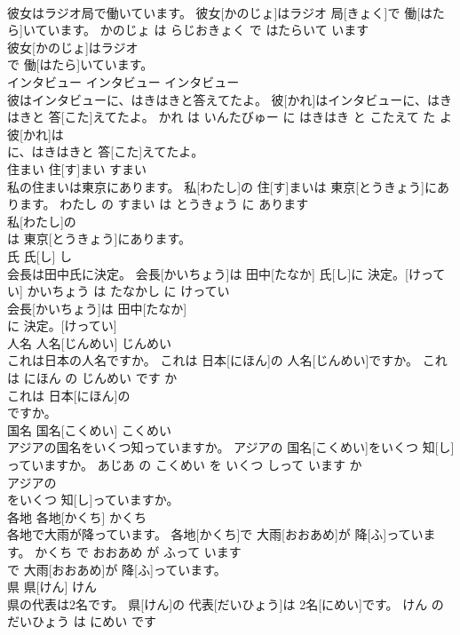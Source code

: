 \documentclass[8pt]{extreport}
\begin{document}
\begin{CJK}{UTF8}{min}
\\	彼女はラジオ局で働いています。	彼女[かのじょ]はラジオ 局[きょく]で 働[はたら]いています。	かのじょ は らじおきょく で はたらいて います	
\\	彼女[かのじょ]はラジオ
\\	で 働[はたら]いています。			
\\	インタビュー	インタビュー	インタビュー	
\\	彼はインタビューに、はきはきと答えてたよ。	彼[かれ]はインタビューに、はきはきと 答[こた]えてたよ。	かれ は いんたびゅー に はきはき と こたえて た よ	
\\	彼[かれ]は
\\	に、はきはきと 答[こた]えてたよ。			
\\	住まい	住[す]まい	すまい	
\\	私の住まいは東京にあります。	私[わたし]の 住[す]まいは 東京[とうきょう]にあります。	わたし の すまい は とうきょう に あります	
\\	私[わたし]の
\\	は 東京[とうきょう]にあります。			
\\	氏	氏[し]	し	
\\	会長は田中氏に決定。	会長[かいちょう]は 田中[たなか] 氏[し]に 決定。[けってい]	かいちょう は たなかし に けってい	
\\	会長[かいちょう]は 田中[たなか]
\\	に 決定。[けってい]			
\\	人名	人名[じんめい]	じんめい	
\\	これは日本の人名ですか。	これは 日本[にほん]の 人名[じんめい]ですか。	これ は にほん の じんめい です か	
\\	これは 日本[にほん]の
\\	ですか。			
\\	国名	国名[こくめい]	こくめい	
\\	アジアの国名をいくつ知っていますか。	アジアの 国名[こくめい]をいくつ 知[し]っていますか。	あじあ の こくめい を いくつ しって います か	
\\	アジアの
\\	をいくつ 知[し]っていますか。			
\\	各地	各地[かくち]	かくち	
\\	各地で大雨が降っています。	各地[かくち]で 大雨[おおあめ]が 降[ふ]っています。	かくち で おおあめ が ふって います	
\\	で 大雨[おおあめ]が 降[ふ]っています。			
\\	県	県[けん]	けん	
\\	県の代表は2名です。	県[けん]の 代表[だいひょう]は 2名[にめい]です。	けん の だいひょう は にめい です	

\end{CJK}
\end{document}
